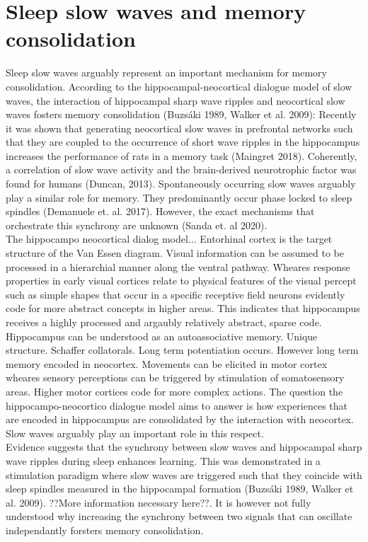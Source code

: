 
\section{Sleep slow waves and memory consolidation}
\label{slow_waves_and_memory}

Sleep slow waves arguably represent an important mechanism for memory consolidation. According to the hippocampal-neocortical dialogue model of slow waves, the interaction of hippocampal sharp wave ripples and neocortical slow waves fosters memory consolidation (Buzsáki 1989, Walker et al. 2009): Recently it was shown that generating neocortical slow waves in prefrontal networks such that they are coupled to the occurrence of short wave ripples in the hippocampus increases the performance of rats in a memory task (Maingret 2018). Coherently, a correlation of slow wave activity and the brain-derived neurotrophic factor was found for humans (Duncan, 2013). Spontaneously occurring slow waves arguably play a similar role for memory. They predominantly occur phase locked to sleep spindles (Demanuele et. al. 2017). However, the exact mechanisms that orchestrate this synchrony are unknown (Sanda et. al 2020).\\
The hippocampo neocortical dialog model... Entorhinal cortex is the target structure of the Van Essen diagram. Visual information can be assumed to be processed in a hierarchial manner along the ventral pathway. Wheares response properties in early visual cortices relate to physical features of the visual percept such as simple shapes that occur in a specific receptive field neurons evidently code for more abstract concepts in higher areas. This indicates that hippocampus receives a highly processed and argaubly relatively abstract, sparse code.\\
Hippocampus can be understood as an autoassociative memory. Unique structure. Schaffer collatorals. Long term potentiation occurs. However long term memory encoded in neocortex. Movements can be elicited in motor cortex wheares sensory perceptions can be triggered by stimulation of somatosensory areas. Higher motor cortices code for more complex actions. The question the hippocampo-neocortico dialogue model aims to answer is how experiences that are encoded in hippocampus are consolidated by the interaction with neocortex. Slow waves arguably play an important role in this respect.\\
Evidence suggests that the synchrony between slow waves and hippocampal sharp wave ripples during sleep enhances learning. This was demonstrated in a stimulation paradigm where slow waves are triggered such that they coincide with sleep spindles measured in the hippocampal formation (Buzsáki 1989, Walker et al. 2009). ??More information necessary here??. It is however not fully understood why increasing the synchrony between two signals that can oscillate independantly forsters memory consolidation.\\
